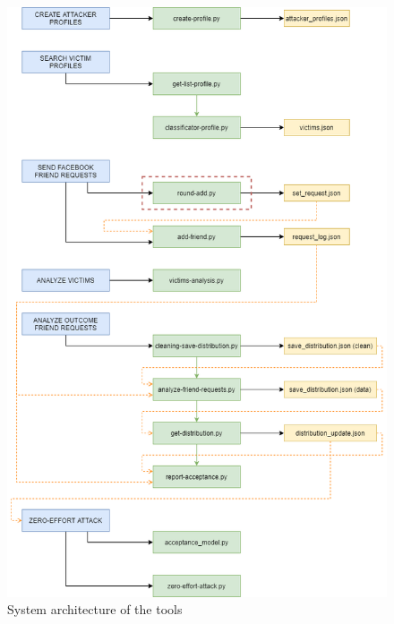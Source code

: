 \begin{figure}[h]
	\caption{System architecture of the tools}
\begin{center}
	\includegraphics[width=13cm]{immagini/architecture-system.png} 
\end{center}
\label{fig:system-arc}
\end{figure}
